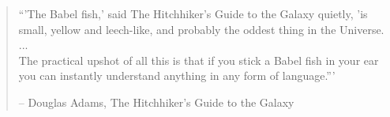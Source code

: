 





	\frontmatter
		
		
		
		\newpage
		\thispagestyle{empty}
		\hspace{1cm}
		\newpage
		\thispagestyle{empty}
		\vspace*{\fill}
		\begin{verse}
			\centering
			``'The Babel fish,' said The Hitchhiker's Guide to the Galaxy quietly, 'is small, yellow and leech-like, and probably the oddest thing in the Universe.\\
			...\\
			The practical upshot of all this is that if you stick a Babel fish in your ear you can instantly understand anything in any form of language.'''

			– Douglas Adams, The Hitchhiker's Guide to the Galaxy

		\end{verse}

